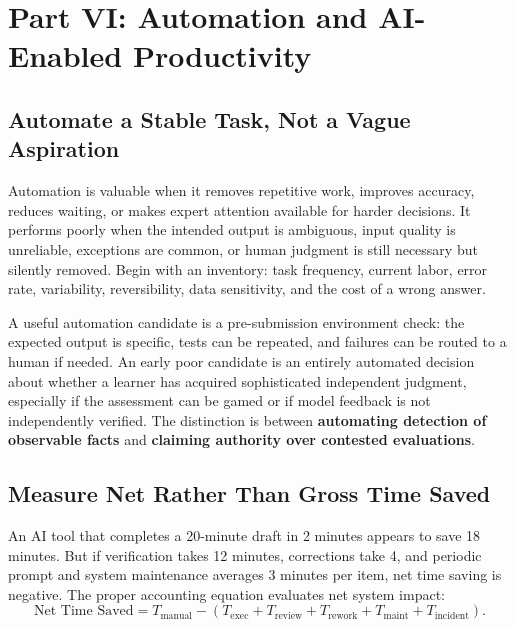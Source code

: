 \section*{Part VI: Automation and AI-Enabled Productivity}

\subsection{Automate a Stable Task, Not a Vague Aspiration}
\label{sec:automate_stable_tasks}

Automation is valuable when it removes repetitive work, improves accuracy, reduces waiting, or makes expert attention available for harder decisions. It performs poorly when the intended output is ambiguous, input quality is unreliable, exceptions are common, or human judgment is still necessary but silently removed. Begin with an inventory: task frequency, current labor, error rate, variability, reversibility, data sensitivity, and the cost of a wrong answer.

A useful automation candidate is a pre-submission environment check: the expected output is specific, tests can be repeated, and failures can be routed to a human if needed. An early poor candidate is an entirely automated decision about whether a learner has acquired sophisticated independent judgment, especially if the assessment can be gamed or if model feedback is not independently verified. The distinction is between \textbf{automating detection of observable facts} and \textbf{claiming authority over contested evaluations}.

\subsection{Measure Net Rather Than Gross Time Saved}
\label{sec:net_time_saved}

An AI tool that completes a 20-minute draft in 2 minutes appears to save 18 minutes. But if verification takes 12 minutes, corrections take 4, and periodic prompt and system maintenance averages 3 minutes per item, net time saving is negative. The proper accounting equation evaluates net system impact:
\begin{equation}
\text{Net Time Saved} = T_{\text{manual}} - (T_{\text{exec}} + T_{\text{review}} + T_{\text{rework}} + T_{\text{maint}} + T_{\text{incident}}).
\end{equation}

